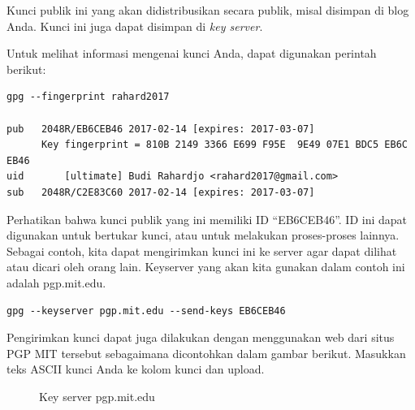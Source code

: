 Kunci publik ini yang akan didistribusikan secara publik, misal disimpan di
blog Anda. Kunci ini juga dapat disimpan di {\em key server}.

Untuk melihat informasi mengenai kunci Anda, dapat digunakan perintah berikut:

\begin{verbatim}
gpg --fingerprint rahard2017

pub   2048R/EB6CEB46 2017-02-14 [expires: 2017-03-07]
      Key fingerprint = 810B 2149 3366 E699 F95E  9E49 07E1 BDC5 EB6C EB46
uid       [ultimate] Budi Rahardjo <rahard2017@gmail.com>
sub   2048R/C2E83C60 2017-02-14 [expires: 2017-03-07]
\end{verbatim}

Perhatikan bahwa kunci publik yang ini memiliki ID ``EB6CEB46''. ID ini dapat
digunakan untuk bertukar kunci, atau untuk melakukan proses-proses lainnya.
Sebagai contoh, kita dapat mengirimkan kunci ini ke server agar dapat dilihat
atau dicari oleh orang lain. Keyserver yang akan kita gunakan dalam contoh ini
adalah pgp.mit.edu.

\begin{verbatim}
gpg --keyserver pgp.mit.edu --send-keys EB6CEB46
\end{verbatim}

Pengirimkan kunci dapat juga dilakukan dengan menggunakan web dari situs PGP
MIT tersebut sebagaimana dicontohkan dalam gambar berikut. Masukkan teks ASCII
kunci Anda ke kolom kunci dan upload.

\begin{figure}[ht]
\caption{Key server pgp.mit.edu}
\label{fig:pgp-mit}
\end{figure}


